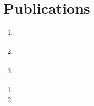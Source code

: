 	\chapter*{Publications}
	\graphicspath{{Publications/Vector/}{Publications/}}
	\begin{enumerate}
		\item{ }
		\item{ }
		\item{ }
		
		
		
	\end{enumerate}
	\begin{enumerate}
		\item 
		\item
		
	\end{enumerate}